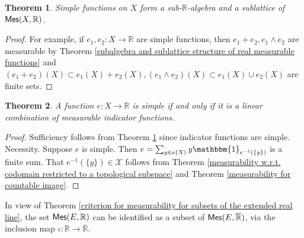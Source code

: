 \documentclass[11pt, a4paper, openany]{book}
\newtheorem{thm}{Theorem}\newtheorem{lem}{Lemma}\newtheorem{crl}{Corollary}
\theoremstyle{definition}
\newcommand{\cat}[1]{\textup{\textsf{#1}}}
\newcommand{\er}{\overline{\mathbb{R}}}
\begin{document}
    \begin{thm}\label{subalgebra and sublattice structure of simple functions}
        Simple functions on $X$ form a sub-$\mathbb{R}$-algebra and a sublattice of $\cat{Mes}(X,\mathbb{R})$.
    \end{thm}
    \begin{proof}
        For example, if $e_1,e_2:X\rightarrow\mathbb{R}$ are simple functions, then $e_1+e_2, e_1\wedge e_2$ are measurable by Theorem \ref{subalgebra and sublattice structure of real measurable functions} and $(e_1+e_2)(X)\subset e_1(X)+e_2(X), (e_1\wedge e_2)(X)\subset e_1(X)\cup e_2(X)$ are finite sets.
    \end{proof}
    \begin{thm}
        A function $e:X\rightarrow \mathbb{R}$ is simple if and only if it is a linear combination of measurable indicator functions.
    \end{thm}
    \begin{proof}
        Sufficiency follows from Theorem \ref{subalgebra and sublattice structure of simple functions} since indicator functions are simple. Necessity. Suppose $e$ is simple. Then $e=\sum_{y\in e(X)}y\mathbbm{1}_{e^{-1}(\{y\})}$ is a finite sum. That $e^{-1}(\{y\})\in\mathscr{X}$ follows from Theorem \ref{measurability w.r.t. codomain restricted to a topological subspace} and Theorem \ref{measurability for countable image}.
    \end{proof}
    In view of Theorem \ref{criterion for measurability for subsets of the extended real line}, the set $\cat{Mes}(E,\mathbb{R})$ can be identified as a subset of $\cat{Mes}(E,\er)$, via the inclusion map $\iota:\mathbb{R}\rightarrow\er$.
\end{document}
